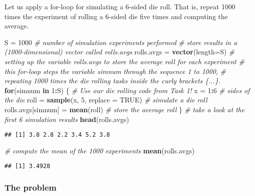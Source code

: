 \documentclass[
]{article}
\newenvironment{Shaded}{\begin{snugshade}}{\end{snugshade}}
\newcommand{\CommentTok}[1]{\textcolor[rgb]{0.56,0.35,0.01}{\textit{#1}}}
\newcommand{\ControlFlowTok}[1]{\textcolor[rgb]{0.13,0.29,0.53}{\textbf{#1}}}
\newcommand{\DataTypeTok}[1]{\textcolor[rgb]{0.13,0.29,0.53}{#1}}
\newcommand{\DecValTok}[1]{\textcolor[rgb]{0.00,0.00,0.81}{#1}}
\newcommand{\KeywordTok}[1]{\textcolor[rgb]{0.13,0.29,0.53}{\textbf{#1}}}
\newcommand{\NormalTok}[1]{#1}
\newcommand{\OperatorTok}[1]{\textcolor[rgb]{0.81,0.36,0.00}{\textbf{#1}}}
\newcommand{\OtherTok}[1]{\textcolor[rgb]{0.56,0.35,0.01}{#1}}
\newcommand{\StringTok}[1]{\textcolor[rgb]{0.31,0.60,0.02}{#1}}
\begin{document}
Let us apply a for-loop for simulating a 6-sided die roll. That is,
repeat 1000 times the experiment of rolling a 6-sided die five times and
computing the average.

\begin{Shaded}
\begin{Highlighting}[]
\NormalTok{S =}\StringTok{ }\DecValTok{1000} \CommentTok{# number of simulation experiments performed}
\CommentTok{# store results in a (1000-dimensional) vector called rolls.avgs}
\NormalTok{rolls.avgs =}\StringTok{ }\KeywordTok{vector}\NormalTok{(}\DataTypeTok{length=}\NormalTok{S)  }
\CommentTok{# setting up the variable rolls.avgs to store the average roll for each experiment}
\CommentTok{# this for-loop steps the variable simnum through the sequence 1 to 1000,}
\CommentTok{# repeating 1000 times the die rolling tasks inside the curly brackets \{...\}.}
\ControlFlowTok{for}\NormalTok{(simnum }\ControlFlowTok{in} \DecValTok{1}\OperatorTok{:}\NormalTok{S)}
\NormalTok{\{}
  \CommentTok{# Use our die rolling code from Task 1!}
\NormalTok{  x =}\StringTok{ }\DecValTok{1}\OperatorTok{:}\DecValTok{6} \CommentTok{# sides of the die}
\NormalTok{  roll =}\StringTok{ }\KeywordTok{sample}\NormalTok{(x, }\DecValTok{5}\NormalTok{, }\DataTypeTok{replace =} \OtherTok{TRUE}\NormalTok{)  }\CommentTok{# simulate a die roll}
\NormalTok{  rolls.avgs[simnum] =}\StringTok{ }\KeywordTok{mean}\NormalTok{(roll) }\CommentTok{# store the average roll}
\NormalTok{\}}
\CommentTok{# take a look at the first 6 simulation results}
\KeywordTok{head}\NormalTok{(rolls.avgs)}
\end{Highlighting}
\end{Shaded}

\begin{verbatim}
## [1] 3.8 2.8 2.2 3.4 5.2 3.8
\end{verbatim}

\begin{Shaded}
\begin{Highlighting}[]
\CommentTok{# compute the mean of the 1000 experiments}
\KeywordTok{mean}\NormalTok{(rolls.avgs)}
\end{Highlighting}
\end{Shaded}

\begin{verbatim}
## [1] 3.4928
\end{verbatim}

\hypertarget{the-problem-1}{%
\subsubsection{The problem}\label{the-problem-1}}
\end{document}
